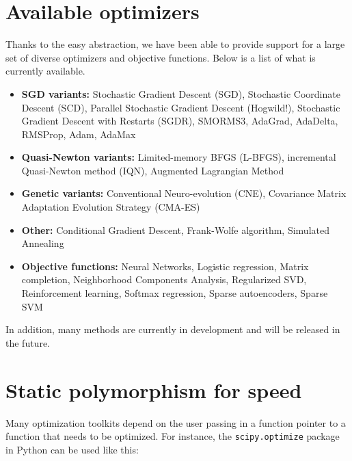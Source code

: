 \documentclass{article}
\begin{document}
\section{Available optimizers}

Thanks to the easy abstraction, we have been able to provide support for a large
set of diverse optimizers and objective functions.  Below is a list of what is
currently available.

\begin{itemize}
  \item {\bf SGD variants:} Stochastic Gradient Descent (SGD), Stochastic
      Coordinate Descent (SCD), Parallel Stochastic Gradient Descent (Hogwild!),
      Stochastic Gradient Descent with Restarts (SGDR), SMORMS3, AdaGrad,
      AdaDelta, RMSProp, Adam, AdaMax

  \item {\bf Quasi-Newton variants:} Limited-memory BFGS (L-BFGS), incremental
        Quasi-Newton method (IQN), Augmented Lagrangian Method

  \item {\bf Genetic variants:} Conventional Neuro-evolution (CNE), Covariance
        Matrix Adaptation Evolution Strategy (CMA-ES)

  \item {\bf Other:} Conditional Gradient Descent, Frank-Wolfe algorithm, Simulated Annealing

  \item {\bf Objective functions:} Neural Networks, Logistic regression,
      Matrix completion, Neighborhood Components Analysis, Regularized SVD,
      Reinforcement learning, Softmax regression, Sparse autoencoders,
      Sparse SVM
\end{itemize}

In addition, many methods are currently in development and will be released in
the future.  %

\section{Static polymorphism for speed}


Many optimization toolkits depend on the user passing in a function pointer to a
function that needs to be optimized.  For instance, the {\tt scipy.optimize}
package in Python can be used like this:
\end{document}
